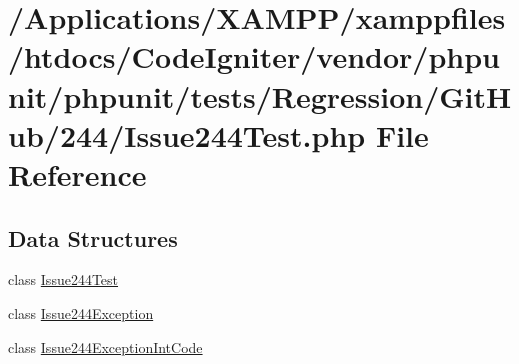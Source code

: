 \hypertarget{_issue244_test_8php}{}\section{/\+Applications/\+X\+A\+M\+P\+P/xamppfiles/htdocs/\+Code\+Igniter/vendor/phpunit/phpunit/tests/\+Regression/\+Git\+Hub/244/\+Issue244\+Test.php File Reference}
\label{_issue244_test_8php}
\subsection*{Data Structures}
\begin{DoxyCompactItemize}
\item 
class \mbox{\hyperlink{class_issue244_test}{Issue244\+Test}}
\item 
class \mbox{\hyperlink{class_issue244_exception}{Issue244\+Exception}}
\item 
class \mbox{\hyperlink{class_issue244_exception_int_code}{Issue244\+Exception\+Int\+Code}}
\end{DoxyCompactItemize}
